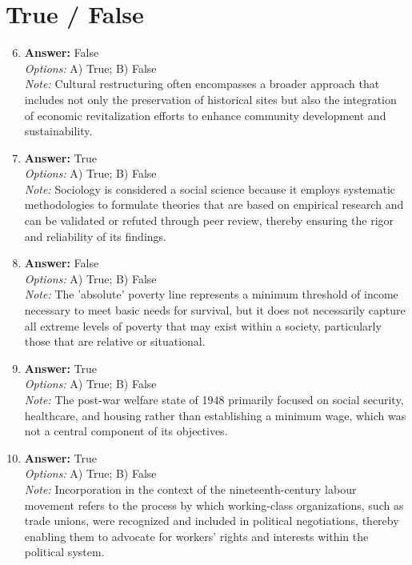 \documentclass[12pt]{article}
\begin{document}
\section*{True / False}
\begin{enumerate}[label=\arabic*.]
\setcounter{enumi}{5}
\item \textbf{Answer:} False
\\ \textit{Options:} A) True; B) False
\\ \textit{Note:} Cultural restructuring often encompasses a broader approach that includes not only the preservation of historical sites but also the integration of economic revitalization efforts to enhance community development and sustainability.
\item \textbf{Answer:} True
\\ \textit{Options:} A) True; B) False
\\ \textit{Note:} Sociology is considered a social science because it employs systematic methodologies to formulate theories that are based on empirical research and can be validated or refuted through peer review, thereby ensuring the rigor and reliability of its findings.
\item \textbf{Answer:} False
\\ \textit{Options:} A) True; B) False
\\ \textit{Note:} The 'absolute' poverty line represents a minimum threshold of income necessary to meet basic needs for survival, but it does not necessarily capture all extreme levels of poverty that may exist within a society, particularly those that are relative or situational.
\item \textbf{Answer:} True
\\ \textit{Options:} A) True; B) False
\\ \textit{Note:} The post-war welfare state of 1948 primarily focused on social security, healthcare, and housing rather than establishing a minimum wage, which was not a central component of its objectives.
\item \textbf{Answer:} True
\\ \textit{Options:} A) True; B) False
\\ \textit{Note:} Incorporation in the context of the nineteenth-century labour movement refers to the process by which working-class organizations, such as trade unions, were recognized and included in political negotiations, thereby enabling them to advocate for workers' rights and interests within the political system.
\end{enumerate}
\end{document}

